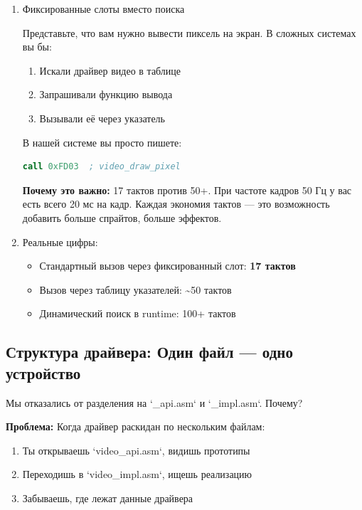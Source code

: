 \documentclass[11pt,a4paper]{scrartcl}
\begin{document}
\begin{enumerate}
\item Фиксированные слоты вместо поиска
\label{sec:org34f2f5c}

Представьте, что вам нужно вывести пиксель на экран. В сложных системах вы бы:

\begin{enumerate}
\item Искали драйвер видео в таблице
\item Запрашивали функцию вывода
\item Вызывали её через указатель
\end{enumerate}

В нашей системе вы просто пишете:

\begin{lstlisting}[language=asm,numbers=none]
call 0xFD03  ; video_draw_pixel
\end{lstlisting}

\textbf{Почему это важно:} 17 тактов против 50+. При частоте кадров 50 Гц у вас есть всего 20 мс на кадр. Каждая экономия тактов — это возможность добавить больше спрайтов, больше эффектов.
\item Реальные цифры:
\label{sec:orga35c2a0}

\begin{itemize}
\item Стандартный вызов через фиксированный слот: \textbf{17 тактов}
\item Вызов через таблицу указателей: \textasciitilde{}50 тактов
\item Динамический поиск в runtime: 100+ тактов
\end{itemize}
\end{enumerate}
\subsection{Структура драйвера: Один файл — одно устройство}
\label{sec:org3ebcc87}

Мы отказались от разделения на `\_api.asm` и `\_impl.asm`. Почему?

\textbf{Проблема:} Когда драйвер раскидан по нескольким файлам:

\begin{enumerate}
\item Ты открываешь `video\_api.asm`, видишь прототипы
\item Переходишь в `video\_impl.asm`, ищешь реализацию
\item Забываешь, где лежат данные драйвера
\end{enumerate}
\end{document}
